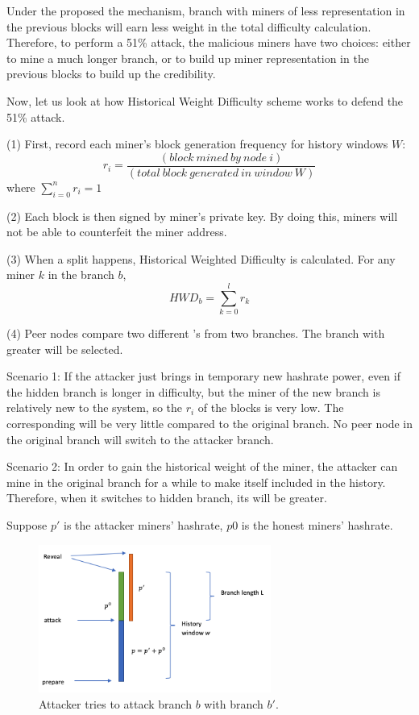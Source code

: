 \documentclass[conference]{IEEEtran}
\begin{document}
Under the proposed the mechanism, branch with miners of less representation in the previous blocks will earn less weight in the total difficulty calculation. Therefore, to perform a 51\% attack, the malicious miners have two choices: either to mine a much longer branch, or to build up miner representation in the previous blocks to build up the credibility.

Now, let us look at how Historical Weight Difficulty scheme works to defend the 51\% attack. 

(1) First, record each miner’s block generation frequency for history windows $W$:
\begin{equation}
r_i=\frac{(block\ mined\ by\ node\ i)}{(total\ block\ generated\ in\ window\ W)}\label{eq}
\end{equation}
where $\sum_{i=0}^{n}r_i = 1$

(2) Each block is then signed by miner's private key. By doing this, miners will not be able to counterfeit the miner address.

(3) When a split happens, Historical Weighted Difficulty   is calculated. For any miner $k$ in the branch $b$,
\begin{equation}
    H\!W\!D_b = \sum_{k=0}^{l}r_k\label{eq}
\end{equation}

(4) Peer nodes compare two different 's from two branches. The branch with greater  will be selected.

Scenario 1: If the attacker just brings in temporary new hashrate power, even if the hidden branch is longer in difficulty, but the miner of the new branch is relatively new to the system, so the $r_i$ of the blocks is very low. The corresponding  will be very little compared to the original branch. No peer node in the original branch will switch to the attacker branch. 

Scenario 2: In order to gain the historical weight of the miner, the attacker can mine in the original branch for a while to make itself included in the history. Therefore, when it switches to hidden branch, its  will be greater. 

Suppose $p'$ is the attacker miners' hashrate, $p0$ is the honest miners' hashrate.

\begin{figure}[htbp]
\centerline{\includegraphics[width=3in]{figure.png}}
\caption{Attacker tries to attack branch $b$ with branch $b'$.}
\label{fig}
\end{figure}
\end{document}
